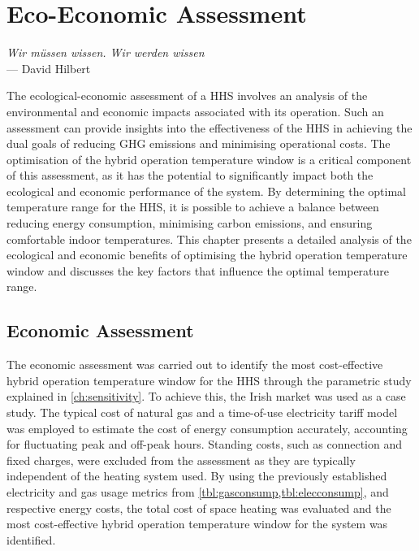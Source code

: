 \chapter{Eco-Economic Assessment}\label{ch:scenarioB} 

\begin{flushright}{\slshape
    Wir m\"ussen wissen. Wir werden wissen} \\ \medskip
    --- David Hilbert
\end{flushright}

The ecological-economic assessment of a \ac{HHS} involves an analysis of the environmental and economic impacts associated with its operation. Such an assessment can provide insights into the effectiveness of the \ac{HHS} in achieving the dual goals of reducing \ac{GHG} emissions and minimising operational costs. The optimisation of the hybrid operation temperature window is a critical component of this assessment, as it has the potential to significantly impact both the ecological and economic performance of the system. By determining the optimal temperature range for the \ac{HHS}, it is possible to achieve a balance between reducing energy consumption, minimising carbon emissions, and ensuring comfortable indoor temperatures. This chapter presents a detailed analysis of the ecological and economic benefits of optimising the hybrid operation temperature window and discusses the key factors that influence the optimal temperature range.

\section{Economic Assessment}

The economic assessment was carried out to identify the most cost-effective hybrid operation temperature window for the \ac{HHS} through the parametric study explained in \cref{ch:sensitivity}. To achieve this, the Irish market was used as a case study. The typical cost of natural gas and a time-of-use electricity tariff model was employed to estimate the cost of energy consumption accurately, accounting for fluctuating peak and off-peak hours. Standing costs, such as connection and fixed charges, were excluded from the assessment as they are typically independent of the heating system used. By using the previously established electricity and gas usage metrics from \cref{tbl:gasconsump,tbl:elecconsump}, and respective energy costs,  the total cost of space heating was evaluated and the most cost-effective hybrid operation temperature window for the system was identified.

